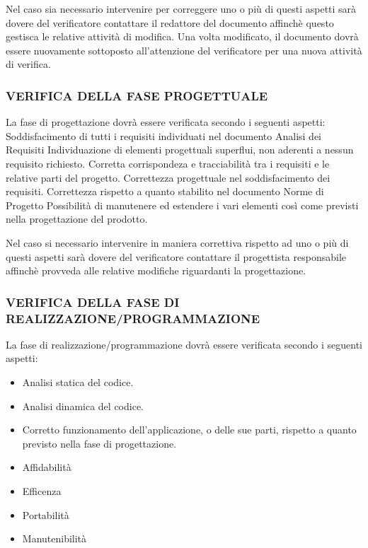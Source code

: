 Nel caso sia necessario intervenire per correggere uno o pi\`u di questi aspetti
sar\`a dovere del verificatore contattare il redattore del documento affinch\`e
questo gestisca le relative attivit\`a di modifica. Una volta modificato, il
documento dovr\`a essere nuovamente sottoposto all'attenzione del verificatore
per una nuova attivit\`a di verifica.

\subsubsection*{VERIFICA DELLA FASE PROGETTUALE}

La fase di progettazione dovr\`a essere verificata secondo i seguenti aspetti:
Soddisfacimento di tutti i requisiti individuati nel documento Analisi dei Requisiti
Individuazione di elementi progettuali superflui, non aderenti a nessun requisito richiesto.
Corretta corrispondeza e tracciabilit\`a tra i requisiti e le relative parti del progetto.
Correttezza progettuale nel soddisfacimento dei requisiti.
Correttezza rispetto a quanto stabilito nel documento Norme di Progetto
Possibilit\`a di manutenere ed estendere i vari elementi cos\`i come previsti nella progettazione del prodotto.


Nel caso si necessario intervenire in maniera correttiva rispetto ad uno o pi\`u di questi aspetti sar\`a dovere del verificatore contattare il progettista responsabile affinch\`e provveda alle relative modifiche riguardanti la progettazione.

\subsubsection*{VERIFICA DELLA FASE DI REALIZZAZIONE/PROGRAMMAZIONE}

La fase di realizzazione/programmazione dovr\`a essere verificata secondo i seguenti aspetti:
\begin{itemize}
\item Analisi statica del codice.
\item Analisi dinamica del codice.
\item Corretto funzionamento dell'applicazione, o delle sue parti, rispetto a
quanto previsto nella fase di progettazione.
\item Affidabilit\`a
\item Efficenza
\item Portabilit\`a
\item Manutenibilit\`a
\end{itemize}

